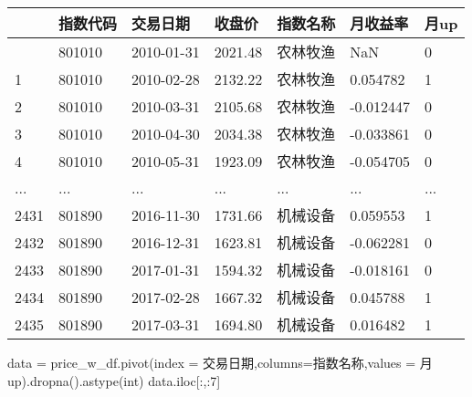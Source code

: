 \documentclass[
  letterpaper,
  DIV=11,
  numbers=noendperiod]{scrreprt}
\newenvironment{Shaded}{\begin{snugshade}}{\end{snugshade}}
\newcommand{\BuiltInTok}[1]{\textcolor[rgb]{0.00,0.23,0.31}{#1}}
\newcommand{\DecValTok}[1]{\textcolor[rgb]{0.68,0.00,0.00}{#1}}
\newcommand{\NormalTok}[1]{\textcolor[rgb]{0.00,0.23,0.31}{#1}}
\newcommand{\OperatorTok}[1]{\textcolor[rgb]{0.37,0.37,0.37}{#1}}
\newcommand{\StringTok}[1]{\textcolor[rgb]{0.13,0.47,0.30}{#1}}
\begin{document}
\begin{longtable}[]{@{}lllllll@{}}
\toprule\noalign{}
& 指数代码 & 交易日期 & 收盘价 & 指数名称 & 月收益率 & 月up \\
\midrule\noalign{}
\endhead
\bottomrule\noalign{}
\endlastfoot
0 & 801010 & 2010-01-31 & 2021.48 & 农林牧渔 & NaN & 0 \\
1 & 801010 & 2010-02-28 & 2132.22 & 农林牧渔 & 0.054782 & 1 \\
2 & 801010 & 2010-03-31 & 2105.68 & 农林牧渔 & -0.012447 & 0 \\
3 & 801010 & 2010-04-30 & 2034.38 & 农林牧渔 & -0.033861 & 0 \\
4 & 801010 & 2010-05-31 & 1923.09 & 农林牧渔 & -0.054705 & 0 \\
... & ... & ... & ... & ... & ... & ... \\
2431 & 801890 & 2016-11-30 & 1731.66 & 机械设备 & 0.059553 & 1 \\
2432 & 801890 & 2016-12-31 & 1623.81 & 机械设备 & -0.062281 & 0 \\
2433 & 801890 & 2017-01-31 & 1594.32 & 机械设备 & -0.018161 & 0 \\
2434 & 801890 & 2017-02-28 & 1667.32 & 机械设备 & 0.045788 & 1 \\
2435 & 801890 & 2017-03-31 & 1694.80 & 机械设备 & 0.016482 & 1 \\
\end{longtable}

\begin{Shaded}
\begin{Highlighting}[]
\NormalTok{data }\OperatorTok{=}\NormalTok{ price\_w\_df.pivot(index }\OperatorTok{=} \StringTok{\textquotesingle{}交易日期\textquotesingle{}}\NormalTok{,columns}\OperatorTok{=}\StringTok{\textquotesingle{}指数名称\textquotesingle{}}\NormalTok{,values }\OperatorTok{=} \StringTok{\textquotesingle{}月up\textquotesingle{}}\NormalTok{).dropna().astype(}\BuiltInTok{int}\NormalTok{)}
\NormalTok{data.iloc[:,:}\DecValTok{7}\NormalTok{]}
\end{Highlighting}
\end{Shaded}
\end{document}
